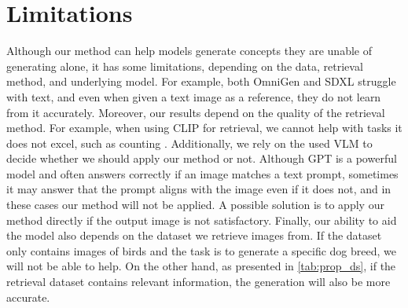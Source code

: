 \section{Limitations} 
\label{sec:limitations}

Although our method can help models generate concepts they are unable of generating alone, it has some limitations, depending on the data, retrieval method, and underlying model. For example, both OmniGen and SDXL struggle with text, and even when given a text image as a reference, they do not learn from it accurately. Moreover, our results depend on the quality of the retrieval method. For example, when using CLIP for retrieval, we cannot help with tasks it does not excel, such as counting \cite{paiss2023teaching}. Additionally, we rely on the used VLM to decide whether we should apply our method or not. Although GPT is a powerful model and often answers correctly if an image matches a text prompt, sometimes it may answer that the prompt aligns with the image even if it does not, and in these cases our method will not be applied. A possible solution is to apply our method directly if the output image is not satisfactory. 
Finally, our ability to aid the model also depends on the dataset we retrieve images from. If the dataset only contains images of birds and the task is to generate a specific dog breed, we will not be able to help. On the other hand, as presented in \cref{tab:prop_ds}, if the retrieval dataset contains relevant information, the generation will also be more accurate.